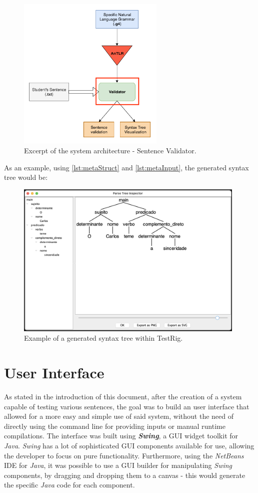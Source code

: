 \begin{figure}[h]
    \centering
    \includegraphics[width=7cm]{images/system_sentence_validator.png}
    \caption{Excerpt of the system architecture - Sentence Validator.}
    \label{fig:systemSentenceValidator}
\end{figure}

\noindent As an example, using \autoref{lst:metaStruct} and \autoref{lst:metaInput}, the generated syntax tree would be:
\begin{figure}[h]
    \centering
    \includegraphics[width=11cm]{images/testrig_gui_example.png}
    \caption{Example of a generated syntax tree within TestRig.}
    \label{fig:testrigGuiExample}
\end{figure}

\newpage
\section{User Interface}

As stated in the introduction of this document, after the creation of a system capable of testing various sentences, the goal was to build an user interface
that allowed for a more easy and simple use of said system, without the need of directly using the command line for providing inputs or manual runtime compilations.
The interface was built using \emph{\textbf{Swing}}, a GUI widget toolkit for \emph{Java}.
\emph{Swing} has a lot of sophisticated GUI components available for use, allowing the developer to focus on pure functionality.
Furthermore, using the \emph{NetBeans} IDE for \emph{Java}, it was possible to use a GUI builder for manipulating \emph{Swing} components, 
by dragging and dropping them to a canvas - this would generate the specific \emph{Java} code for each component.

